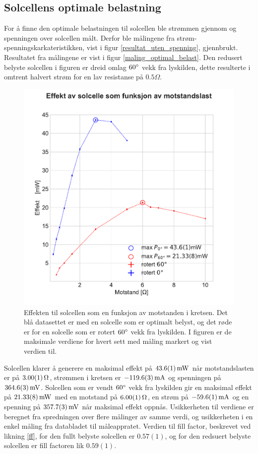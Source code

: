 \documentclass[%
 reprint,
 amsmath,amssymb,
 aps,
 norsk,
 booktabs
]{revtex4-1}
\begin{document}
\subsection{Solcellens optimale belastning}
For å finne den optimale belastningen til solcellen ble strømmen gjennom og spenningen over solcellen målt. Derfor ble målingene fra strøm-spenningskarkateristikken, vist i figur \vref{resultat_uten_spenning}, gjennbrukt. Resultatet fra målingene er vist i figur \vref{maling_optimal_belast}. Den redusert belyste solcellen i figuren er dreid omlag $60\degree$ vekk fra lyskilden, dette resulterte i omtrent halvert strøm for en lav resistanse på $0.5\Omega$.
\begin{figure}
  \centering
  \includegraphics[scale=0.47]{effekt.pdf}
  \caption{Effekten til solcellen som en funksjon av motstanden i kretsen. Det blå datasettet er med en solcelle som er optimalt belyst, og det røde er for en solcelle som er rotert $60\degree$ vekk fra lyskilden. I figuren er de maksimale verdiene for hvert sett med måling markert og vist verdien til.}
  \label{maling_optimal_belast}
\end{figure}
Solcellen klarer å generere en maksimal effekt på $\SI{43.6\pm0.1}{\milli\watt}$ når motstandslasten er på $\SI{3.00\pm0.01}{\Omega}$, strømmen i kretsen er $-\SI{119.6\pm0.3}{\milli\ampere}$ og spenningen på $\SI{364.6\pm0.3}{\milli\volt}$. Solcellen som er vendt $60\degree$ vekk fra lyskilden gir en maksimal effekt på $\SI{21.33\pm0.08}{\milli\watt}$
med en motstand på $\SI{6.00\pm0.01}{\Omega}$, en strøm på $-\SI{59.6\pm0.1}{\milli\ampere}$ og en spenning på $\SI{357.7\pm0.3}{\milli\volt}$ når maksimal effekt oppnås. Usikkerheten til verdiene er beregnet fra spredningen over flere målinger av samme verdi, og usikkerheten i en enkel måling fra databladet til måleappratet.
Verdien til fill factor, beskrevet ved likning \eqref{ff}, for den fullt belyste solcellen er $0.57(1)$, og for den redsuert belyste solcellen er fill factoren lik $0.59(1)$.
\end{document}
